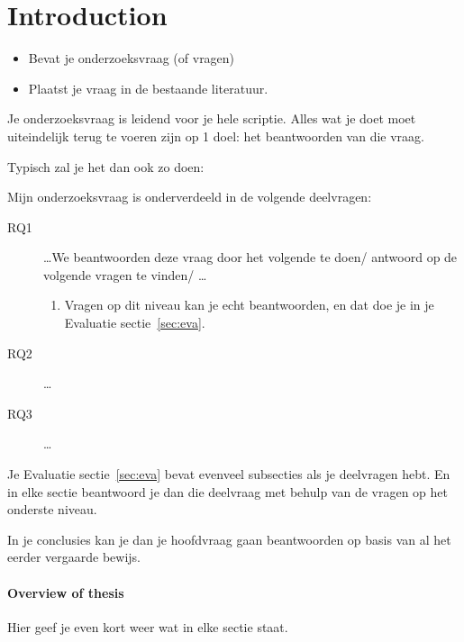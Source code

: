 \section{Introduction}
\label{sec:intro}
\begin{itemize}
\item Bevat je onderzoeksvraag (of vragen)
\item Plaatst je vraag in de bestaande literatuur.
\end{itemize}

Je onderzoeksvraag is leidend voor je hele scriptie. Alles wat je doet moet uiteindelijk terug te voeren zijn op 1 doel: het beantwoorden van die vraag. 

Typisch zal je het dan ook zo doen:

Mijn onderzoeksvraag is onderverdeeld in de volgende deelvragen:

\begin{description}
\item[RQ1] \ldots We   beantwoorden deze vraag  door het volgende te doen/ antwoord op de volgende vragen te vinden/ \ldots
\begin{enumerate}
\item Vragen op dit niveau kan je echt beantwoorden, en dat doe je in je Evaluatie sectie~\ref{sec:eva}.
\end{enumerate}
\item[RQ2] \ldots
\item[RQ3] \ldots
\end{description}
%
Je Evaluatie sectie~\ref{sec:eva} bevat evenveel subsecties als je deelvragen hebt. En in elke sectie beantwoord je dan die deelvraag met behulp van de vragen op het onderste niveau.

In je conclusies kan je dan je hoofdvraag gaan beantwoorden op basis van al het eerder vergaarde bewijs.


\paragraph{Overview of thesis}
Hier geef je even kort weer wat in elke sectie staat.